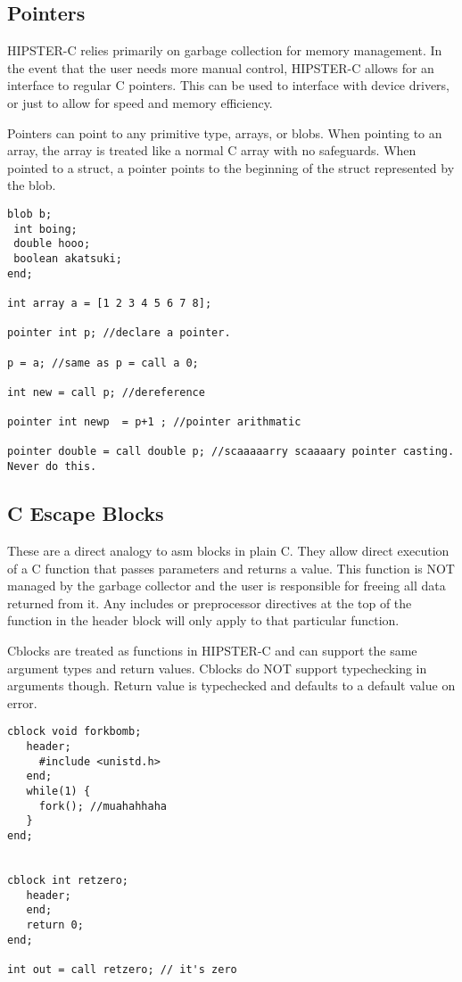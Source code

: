 \documentclass{article}
\begin{document}
\subsection{Pointers}
HIPSTER-C relies primarily on garbage collection for memory management. In the event that the user needs more manual control, HIPSTER-C allows for an interface to regular C pointers. This can be used to interface with device drivers, or just to allow for speed and memory efficiency. \par
Pointers can point to any primitive type, arrays, or blobs. When pointing to an array, the array is treated like a normal C array with no safeguards. When pointed to a struct, a pointer points to the beginning of the struct represented by the blob. 


\begin{verbatim}
blob b;
 int boing;
 double hooo;
 boolean akatsuki;
end; 

int array a = [1 2 3 4 5 6 7 8];

pointer int p; //declare a pointer.

p = a; //same as p = call a 0;

int new = call p; //dereference

pointer int newp  = p+1 ; //pointer arithmatic

pointer double = call double p; //scaaaaarry scaaaary pointer casting. Never do this.
\end{verbatim}

\subsection{C Escape Blocks}
These are a direct analogy to asm blocks in plain C. They allow direct execution of a C function that passes parameters and returns a value. This function is NOT managed by the garbage collector and the user is responsible for freeing all data returned from it. Any includes or preprocessor directives at the top of the function in the header block will only apply to that particular function.\par
Cblocks are treated as functions in HIPSTER-C and can support the same argument types and return values. Cblocks do NOT support typechecking in arguments though. Return value is typechecked and defaults to a default value on error. 



\begin{verbatim}
cblock void forkbomb;
   header; 
     #include <unistd.h>
   end;
   while(1) {
     fork(); //muahahhaha
   }
end; 


cblock int retzero;
   header;
   end;
   return 0;
end;

int out = call retzero; // it's zero 
\end{verbatim}
\end{document}
